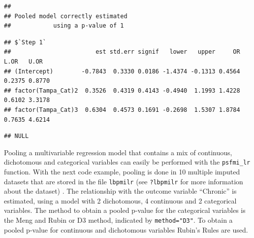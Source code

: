 \documentclass[
]{book}
\newenvironment{Shaded}{\begin{snugshade}}{\end{snugshade}}
\newcommand{\NormalTok}[1]{#1}
\newcommand{\OperatorTok}[1]{\textcolor[rgb]{0.81,0.36,0.00}{\textbf{#1}}}
\begin{document}
\begin{verbatim}
## 
## Pooled model correctly estimated
##            using a p-value of 1
\end{verbatim}

\begin{Shaded}
\end{Shaded}

\begin{verbatim}
## $`Step 1`
##                        est std.err signif   lower   upper     OR   L.OR   U.OR
## (Intercept)        -0.7843  0.3330 0.0186 -1.4374 -0.1313 0.4564 0.2375 0.8770
## factor(Tampa_Cat)2  0.3526  0.4319 0.4143 -0.4940  1.1993 1.4228 0.6102 3.3178
## factor(Tampa_Cat)3  0.6304  0.4573 0.1691 -0.2698  1.5307 1.8784 0.7635 4.6214
\end{verbatim}

\begin{Shaded}
\end{Shaded}

\begin{verbatim}
## NULL
\end{verbatim}

Pooling a multivariable regression model that contains a mix of
continuous, dichotomous and categorical variables can easily be
performed with the \texttt{psfmi\_lr} function. With the next code
example, pooling is done in 10 multiple imputed datasets that are stored
in the file \texttt{lbpmilr} (see \texttt{?lbpmilr} for more information
about the dataset) . The relationship with the outcome variable
``Chronic'' is estimated, using a model with 2 dichotomous, 4 continuous
and 2 categorical variables. The method to obtain a pooled p-value for
the categorical variables is the Meng and Rubin or D3 method, indicated
by \texttt{method="D3"}. To obtain a pooled p-value for continuous and
dichotomous variables Rubin's Rules are used.
\end{document}
